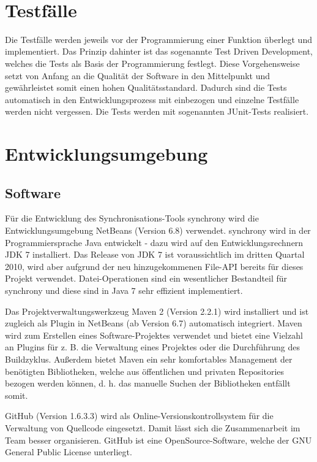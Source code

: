 \documentclass[12pt,oneside,a4paper,bibtotoc,liststotoc,pointlessnumbers]{scrartcl}
\begin{document}
\
\newpage
\section{Testfälle}
Die Testfälle werden jeweils vor der Programmierung einer Funktion überlegt und implementiert. Das Prinzip dahinter ist das sogenannte
Test Driven Development, welches die Tests als Basis der Programmierung festlegt. Diese Vorgehensweise setzt von Anfang an die Qualität
der Software in den Mittelpunkt und gewährleistet somit einen hohen Qualitätsstandard. Dadurch sind die Tests automatisch in den 
Entwicklungsprozess mit einbezogen und einzelne Testfälle werden nicht vergessen. Die Tests werden mit sogenannten JUnit-Tests realisiert.
\newpage
\section{Entwicklungsumgebung}
\subsection{Software}
Für die Entwicklung des Synchronisations-Tools synchrony wird die Entwicklungsumgebung NetBeans (Version 6.8) verwendet.
synchrony wird in der Programmiersprache Java entwickelt - dazu wird auf den Entwicklungsrechnern JDK 7 installiert.
Das Release von JDK 7 ist voraussichtlich im dritten Quartal 2010, wird aber aufgrund der neu hinzugekommenen File-API bereits für
dieses Projekt verwendet. Datei-Operationen sind ein wesentlicher Bestandteil für synchrony und diese sind in Java 7 sehr effizient
implementiert.

Das Projektverwaltungswerkzeug Maven 2 (Version 2.2.1) wird installiert und ist zugleich als Plugin in NetBeans (ab Version 6.7) automatisch
integriert. Maven wird zum Erstellen eines Software-Projektes verwendet und bietet eine Vielzahl an Plugins für z. B. die Verwaltung eines
Projektes oder die Durchführung des Buildzyklus. Außerdem bietet Maven ein sehr komfortables Management der benötigten Bibliotheken, welche
aus öffentlichen und privaten Repositories bezogen werden können, d. h. das manuelle Suchen der Bibliotheken entfällt somit.

GitHub (Version 1.6.3.3) wird als Online-Versionskontrollsystem für die Verwaltung von Quellcode eingesetzt. Damit lässt sich die Zusammenarbeit im
Team besser organisieren. GitHub ist eine OpenSource-Software, welche der GNU General Public License unterliegt.
\end{document}
